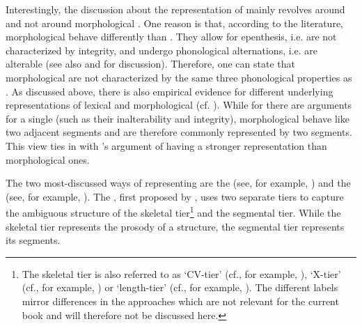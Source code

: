 Interestingly, the discussion about the representation of  mainly revolves around  and not around morphological  . One reason is that, according to the literature, morphological  behave differently than . They allow for epenthesis, i.e. are not characterized by integrity, and  undergo phonological alternations, i.e. are alterable (see also \citealt{Kenstowicz.1994,Kirchner.2001} and \citealt{Ridouane.2010} for discussion). Therefore, one can state that morphological  are not characterized by  the same three phonological properties as . 
As discussed above, there is also empirical evidence for different underlying representations of lexical and morphological  (cf. \citealt{Ridouane.2010,Galea.2014}). While for  there are arguments for a single  (such as their inalterability and integrity), morphological  behave like two adjacent segments and are therefore commonly represented by two segments. This view ties in with \citeauthor{Ridouane.2010}'s argument of  having a stronger representation than morphological ones.

The two most-discussed ways of representing  are the  (see, for example, \citealt{Leben.1980,Hayes.1986b,Levin.1985,Ridouane.2010}) and the   (see, for example, \citealt{Hayes.1989,Davis.2014,Topintzi.2008}). 
The , first proposed by \cite{Leben.1980}, uses two separate tiers to capture the ambiguous structure of  \textendash the skeletal tier\footnote{The skeletal tier is also referred to as `CV-tier' (cf., for example, \citealt{Hayes.1986b, Ridouane.2010,Ridouane.2017}), `X-tier' (cf., for example, \citealt{Levin.1985}) or `length-tier' (cf., for example, \citealt{Vago.2011}). The different labels mirror differences in the approaches which are not relevant for the current book and will therefore not be discussed here.}
and the segmental tier. While the skeletal tier represents the prosody of a structure, the segmental tier represents its segments. 

